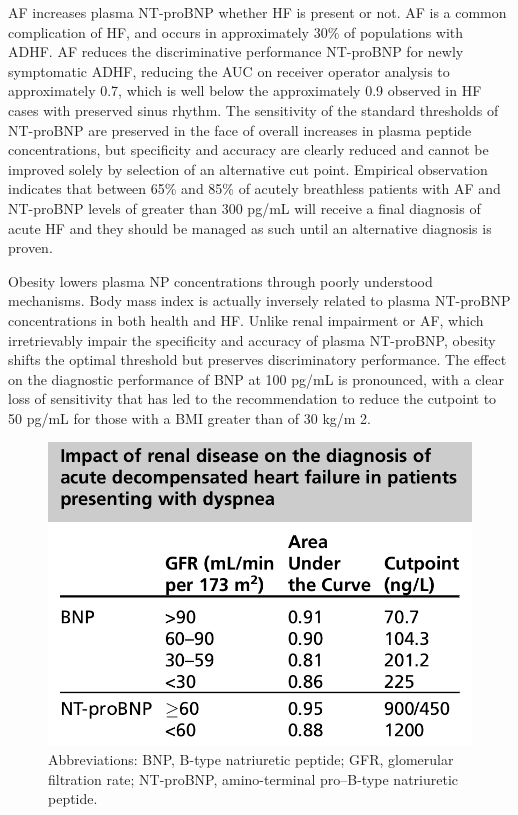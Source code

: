 \documentclass[14pt,a4paper,onecolumn]{extarticle}
\begin{document}
AF increases plasma NT-proBNP whether HF is present or not. AF is a common complication of HF, and occurs in approximately 30\% of populations with ADHF. AF reduces the discriminative performance NT-proBNP for newly symptomatic ADHF, reducing the AUC on receiver operator analysis to approximately 0.7, which is well below the approximately 0.9 observed in HF cases with preserved sinus rhythm.  The sensitivity of the standard thresholds of NT-proBNP are preserved in the face of overall increases in plasma peptide concentrations, but specificity and accuracy are clearly reduced and cannot be improved solely by selection of an alternative cut point. Empirical observation indicates that between 65\% and 85\% of acutely breathless patients with AF and NT-proBNP levels of greater than 300 pg/mL will receive a final diagnosis of acute HF and they should be managed as such until an alternative diagnosis is proven.  \citep{Richards2013}

Obesity lowers plasma NP concentrations through poorly understood mechanisms. Body mass index is actually inversely related to plasma NT-proBNP concentrations in both health and HF. Unlike renal impairment or AF, which irretrievably impair the specificity and accuracy of plasma NT-proBNP, obesity shifts the optimal threshold but preserves discriminatory performance. The effect on the diagnostic performance of BNP at 100 pg/mL is pronounced, with a clear loss of sensitivity that has led to the recommendation to reduce the cutpoint to 50 pg/mL for those with a BMI greater than of 30 kg/m 2. \citep{Daniels2006}

\begin{figure}   \includegraphics{../../images/NP_obesity.png}   \caption{Abbreviations: BNP, B-type natriuretic peptide; GFR, glomerular filtration rate; NT-proBNP, amino-terminal pro–B-type natriuretic peptide. \citep{DeFilippi2008}}   \label{NP_obesity} \end{figure}
\end{document}
